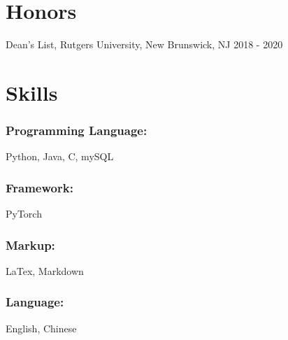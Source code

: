 \documentclass{article}
\begin{document}
\section{Honors}
Dean's List, Rutgers University, New Brunswick, NJ
\hfill{2018 - 2020}\\


\section{Skills}

\subsubsection{Programming Language:}

Python, Java, C, mySQL

\subsubsection{Framework:}

PyTorch

\subsubsection{Markup:}

LaTex, Markdown

\subsubsection{Language:}
English, Chinese
\end{document}
